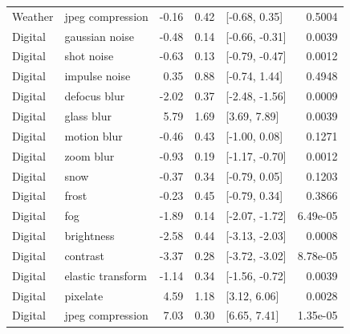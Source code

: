 \begin{longtable}{llrrlr}
Weather & jpeg compression & -0.16 & 0.42 & [-0.68, 0.35] & 0.5004\\
Digital & gaussian noise & -0.48 & 0.14 & [-0.66, -0.31] & 0.0039\\
Digital & shot noise & -0.63 & 0.13 & [-0.79, -0.47] & 0.0012\\
Digital & impulse noise & 0.35 & 0.88 & [-0.74, 1.44] & 0.4948\\
Digital & defocus blur & -2.02 & 0.37 & [-2.48, -1.56] & 0.0009\\
Digital & glass blur & 5.79 & 1.69 & [3.69, 7.89] & 0.0039\\
Digital & motion blur & -0.46 & 0.43 & [-1.00, 0.08] & 0.1271\\
Digital & zoom blur & -0.93 & 0.19 & [-1.17, -0.70] & 0.0012\\
Digital & snow & -0.37 & 0.34 & [-0.79, 0.05] & 0.1203\\
Digital & frost & -0.23 & 0.45 & [-0.79, 0.34] & 0.3866\\
Digital & fog & -1.89 & 0.14 & [-2.07, -1.72] & 6.49e-05\\
Digital & brightness & -2.58 & 0.44 & [-3.13, -2.03] & 0.0008\\
Digital & contrast & -3.37 & 0.28 & [-3.72, -3.02] & 8.78e-05\\
Digital & elastic transform & -1.14 & 0.34 & [-1.56, -0.72] & 0.0039\\
Digital & pixelate & 4.59 & 1.18 & [3.12, 6.06] & 0.0028\\
Digital & jpeg compression & 7.03 & 0.30 & [6.65, 7.41] & 1.35e-05\\
\end{longtable}\endgroup
